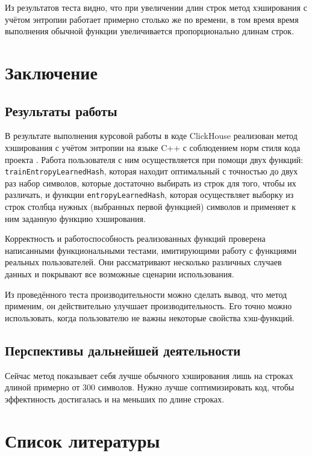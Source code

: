 \documentclass[a4paper,12pt]{extarticle}
\begin{document}
\begin{sloppypar}
Из результатов теста видно, что при увеличении длин строк метод хэширования с учётом энтропии работает примерно столько же по времени, в том время время выполнения обычной функции увеличивается пропорционально длинам строк.

\newpage

\section{Заключение}
\subsection{Результаты работы}
В результате выполнения курсовой работы в коде ClickHouse реализован метод хэширования с учётом энтропии на языке C++ с соблюдением норм стиля кода проекта \cite{clickhouse_code_style_guide}. Работа пользователя с ним осуществляется при помощи двух функций: \texttt{trainEntropyLearnedHash}, которая находит оптимальный с точностью до двух раз набор символов, которые достаточно выбирать из строк для того, чтобы их различать, и функции \texttt{entropyLearnedHash}, которая осуществляет выборку из строк столбца нужных (выбранных первой функцией) символов и применяет к ним заданную функцию хэширования.

Корректность и работоспособность реализованных функций проверена написанными функциональными тестами, имитирующими работу с функциями реальных пользователей. Они рассматривают несколько различных случаев данных и покрывают все возможные сценарии использования.

Из проведённого теста производительности можно сделать вывод, что метод применим, он действительно улучшает производительность. Его точно можно использовать, когда пользователю не важны некоторые свойства хэш-функций. 

\subsection{Перспективы дальнейшей деятельности}

Сейчас метод показывает себя лучше обычного хэширования лишь на строках длиной примерно от 300 символов. Нужно лучше соптимизировать код, чтобы эффектиность достигалась и на меньших по длине строках.

\newpage

\section{Список литературы}
\printbibliography[heading=none]
\newpage

\end{sloppypar}
\end{document}
